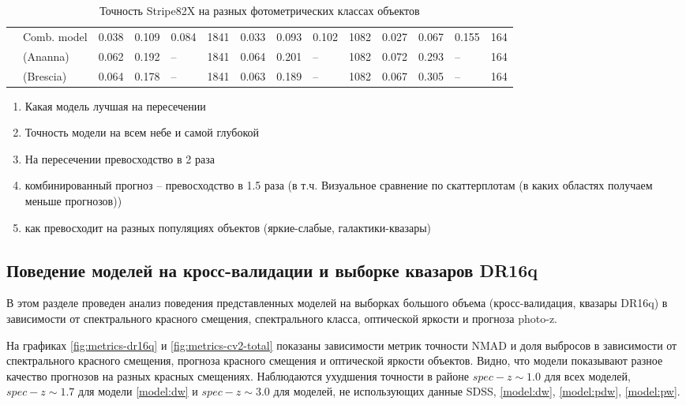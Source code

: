 \documentclass[fleqn,usenatbib]{mnras}
\begin{document}
\begin{table}
\begin{tabular}{lllllrlllrlllr}
                       & Comb. model &              0.038 &           0.109 &            0.084 &        1841 &              0.033 &           0.093 &           0.102 &        1082 &              0.027 &           0.067 &            0.155 &         164 \\
                       & (Ananna) &              0.062 &           0.192 &           -- &        1841 &              0.064 &           0.201 &          -- &        1082 &              0.072 &           0.293 &           -- &         164 \\
                       & (Brescia) &              0.064 &           0.178 &           -- &        1841 &              0.063 &           0.189 &          -- &        1082 &              0.067 &           0.305 &           -- &         164 \\
            \hline
            \end{tabular}
            \caption{Точность Stripe82X на разных фотометрических классах объектов}\label{tab:stripe82x-phot-class}
\end{table}

\begin{enumerate}
	\item Какая модель лучшая на пересечении
	\item Точность модели на всем небе и самой глубокой
	\item На пересечении превосходство в 2 раза
	\item комбинированный прогноз -- превосходство в 1.5 раза (в т.ч. Визуальное сравнение по скаттерплотам (в каких областях получаем меньше прогнозов))
	\item как превосходит на разных популяциях объектов (яркие-слабые, галактики-квазары)
\end{enumerate}

\subsection{Поведение моделей на кросс-валидации и выборке квазаров DR16q}\label{ssec:results-cv2-and-dr16q}

В этом разделе проведен анализ поведения представленных моделей на выборках большого объема (кросс-валидация, квазары DR16q) в зависимости от спектрального красного смещения, спектрального класса, оптической яркости и прогноза photo-z.

На графиках \ref{fig:metrics-dr16q} и \ref{fig:metrics-cv2-total} показаны зависимости метрик точности NMAD и доля выбросов в зависимости от спектрального красного смещения, прогноза красного смещения и оптической яркости объектов. Видно, что модели показывают разное качество прогнозов на разных красных смещениях. Наблюдаются ухудшения точности в районе $spec-z \sim 1.0$ для всех моделей, $spec-z \sim 1.7$ для модели \ref{model:dw} и $spec-z \sim 3.0$ для моделей, не использующих данные SDSS, \ref{model:dw}, \ref{model:pdw}, \ref{model:pw}. %
\end{document}
